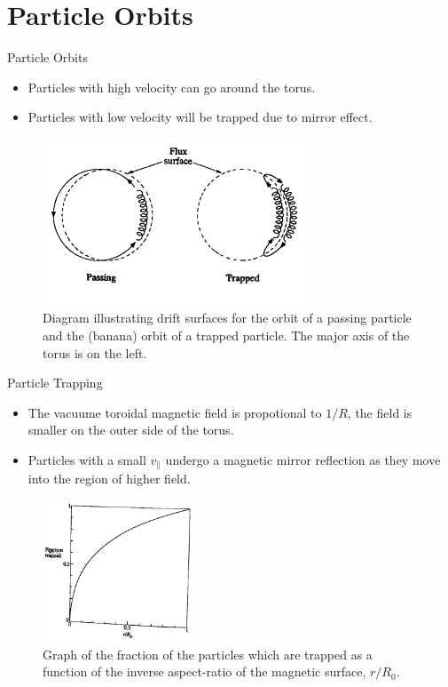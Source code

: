 \section{Particle Orbits}
\begin{frame}{Particle Orbits}
    \begin{itemize}
        \item Particles with high velocity can go around the torus.
        \item Particles with low velocity will be trapped due to mirror effect.
    \end{itemize}
    \begin{figure}
        \centering
        \includegraphics[width=0.7\textwidth]{figures/drift-surface.png}
        \caption{Diagram illustrating drift surfaces for the orbit of a passing particle and the (banana) orbit of a trapped particle. The major axis of the torus is on the left.}
        \label{fig:drift-surfaces}
    \end{figure}
\end{frame}

\begin{frame}{Particle Trapping}
    \begin{itemize}
        \item The vacuume toroidal magnetic field is propotional to $1/R$, the field is smaller on the outer side of the torus.
        \item Particles with a small $v_\parallel$ undergo a magnetic mirror reflection as they move into the region of higher field.
    \end{itemize}
    \begin{figure}
        \centering
        \includegraphics[width=0.4\textwidth]{figures/fraction-trapped.png}
        \caption{Graph of the fraction of the particles which are trapped as a function of the inverse aspect-ratio of the magnetic surface, $r/R_0$.}
        \label{fig:fraction-trapped}
    \end{figure}
\end{frame}

